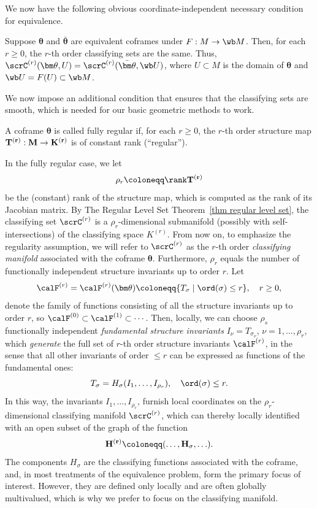 We now have the following obvious coordinate-independent necessary condition for equivalence.

\begin{prop}\label{prop 8.11 Olver93}
    Suppose $\bm\theta$ and $\bar{\bm\theta}$ are equivalent coframes under $F:M\to \wb M$. Then, for each $r\geq 0$, the $r$-th order classifying sets are the same. Thus, $\scrC^{(r)}(\bm\theta,U)=\scrC^{(r)}(\bar{\bm\theta},\wb U)$, where $U\subset M$ is the domain of $\bm\theta$ and $\wb U=F(U)\subset\wb M$.
\end{prop}

We now impose an additional condition that ensures that the classifying sets are smooth, which is needed for our basic geometric methods to work.

\begin{defn}\label{def fully regular coframe}
    A coframe $\bm\theta$ is called fully regular if, for each $r\geq 0$, the $r$-th order structure map $\bf{T}^{(r)}:M\to K^{(r)}$ is of constant rank (``regular'').
\end{defn}

In the fully regular case, we let 
\[\rho_r\coloneqq \rank \bf{T}^{(r)}\]  
be the (constant) rank of the structure map, which is computed as the rank of its Jacobian matrix. By The Regular Level Set Theorem~\ref{thm regular level set}, the classifying set $\scrC^{(r)}$ is a $\rho_r$-dimensional submanifold (possibly with self-intersections) of the classifying space $K^{(r)}$. From now on, to emphasize the regularity assumption, we will refer to $\scrC^{(r)}$ as the $r$-th order \emph{classifying manifold} associated with the coframe $\bm\theta$. Furthermore, $\rho_r$ equals the number of functionally independent structure invariants up to order $r$. Let 
\[\calF^{(r)}=\calF^{(r)}(\bm\theta)\coloneqq \{T_\sigma\mid \ord(\sigma)\leq r\},\quad r\geq 0,\]
denote the family of functions consisting of all the structure invariants up to order $r$, so $\calF^{(0)}\subset\calF^{(1)}\subset\cdots$. Then, locally, we can choose $\rho_s$ functionally independent \emph{fundamental structure invariants} $I_\nu=T_{\sigma_\nu}$, $\nu=1,\ldots,\rho_r$, which \emph{generate} the full set of $r$-th order structure invariants $\calF^{(r)}$, in the sense that all other invariants of order $\leq r$ can be expressed as functions of the fundamental ones:
\[T_\sigma=H_\sigma(I_1,\ldots,I_{\rho_r}),\quad \ord(\sigma)\leq r.\]
In this way, the invariants $I_1,\ldots,I_{\rho_r}$, furnish local coordinates on the $\rho_r$-dimensional classifying manifold $\scrC^{(r)}$, which can thereby locally identified with an open subset of the graph of the function 
\[\bf{H}^{(r)}\coloneqq (\ldots,H_\sigma,\ldots).\]
The components $H_\sigma$ are the classifying functions associated with the coframe, and, in most treatments of the equivalence problem, form the primary focus of interest. However, they are defined only locally and are often globally multivalued, which is why we prefer to focus on the classifying manifold.


